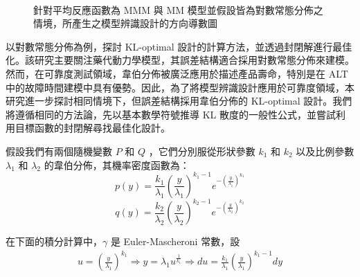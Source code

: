 \begin{figure}[H]
\centering
{}
 \\
\caption{針對平均反應函數為 MMM 與 MM 模型並假設皆為對數常態分佈之情境，所產生之模型辨識設計的方向導數圖}
\label{fig:Fidalgo-lognormal}
\end{figure}

\hspace*{8mm} \cite{lopez2007optimal} 以對數常態分佈為例，探討 KL-optimal 設計的計算方法，並透過封閉解進行最佳化。該研究主要關注藥代動力學模型，其誤差結構適合採用對數常態分佈來建模。然而，在可靠度測試領域，韋伯分佈被廣泛應用於描述產品壽命，特別是在 ALT 中的故障時間建模中具有優勢。因此，為了將模型辨識設計應用於可靠度領域，本研究進一步探討相同情境下，但誤差結構採用韋伯分佈的 KL-optimal 設計。我們將遵循相同的方法論，先以基本數學符號推導 KL 散度的一般性公式，並嘗試利用目標函數的封閉解尋找最佳化設計。

\hspace*{8mm} 假設我們有兩個隨機變數 $P$ 和 $Q$ ，它們分別服從形狀參數 $k_1$ 和 $k_2$ 以及比例參數 $\lambda_1$ 和 $\lambda_2$ 的韋伯分佈，其機率密度函數為：
\begin{equation}
p(y) = \frac{k_1}{\lambda_1} \left(\frac{y}{\lambda_1}\right)^{k_1-1} e^{-(\frac{y}{\lambda_1})^{k_1}}
\end{equation}
\begin{equation}
q(y) = \frac{k_2}{\lambda_2} \left(\frac{y}{\lambda_2}\right)^{k_2-1} e^{-(\frac{y}{\lambda_2})^{k_2}}
\end{equation}

在下面的積分計算中，$\gamma$ 是 Euler-Mascheroni 常數，設
\begin{align*}
u=\left(\frac{y}{\lambda_1}\right)^{k_1}\Rightarrow y=\lambda_1u^{\frac{1}{k_1}}\Rightarrow du=\frac{k_1}{\lambda_1} \left(\frac{y}{\lambda_1}\right)^{k_1-1}dy
\end{align*}

